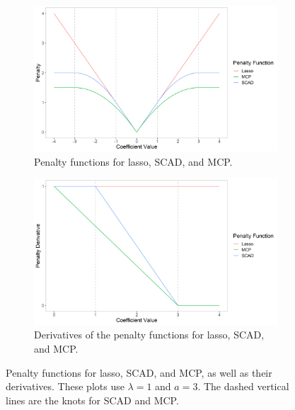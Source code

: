 \documentclass{article}
\begin{document}
	\begin{figure}[!h]
		\centering
		\begin{subfigure}[b]{0.45\textwidth}
			\includegraphics[width=\textwidth]{images/lasso-scad-mcp-penalty.png}
			\captionsetup{width = 0.8\textwidth}
			\caption{Penalty functions for lasso, SCAD, and MCP.}
			\label{fig:penalty}
		\end{subfigure}
		\hspace{30pt}
		\begin{subfigure}[b]{0.45\textwidth}
			\includegraphics[width=\textwidth]{images/lasso-scad-mcp-derivative.png}
			\captionsetup{width = 0.8\textwidth}
			\caption{Derivatives of the penalty functions for lasso, SCAD, and MCP.}
			\label{fig:derivative}
		\end{subfigure}
		\captionsetup{width = 0.9\textwidth}
		\caption{Penalty functions for lasso, SCAD, and MCP, as well as their derivatives. These plots use $\lambda = 1$ and $a = 3$. The dashed vertical lines are the knots for SCAD and MCP.}
		\label{fig:lasso-scad-mcp}
	\end{figure}
	
\end{document}
